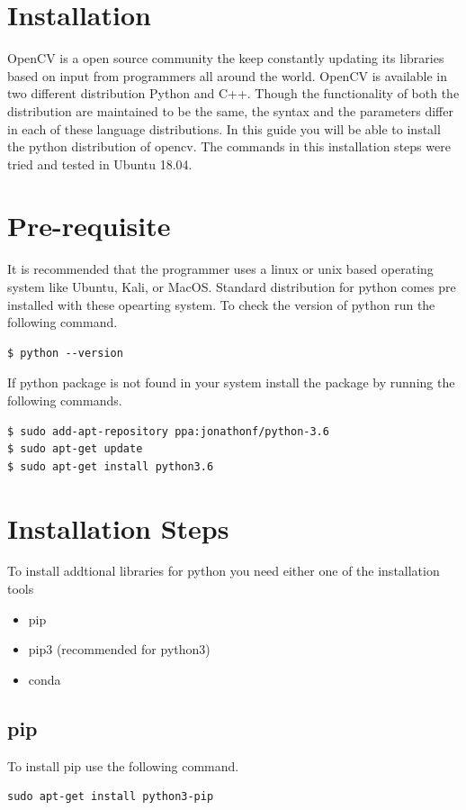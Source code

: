 \documentclass[11pt]{article}
\begin{document}
\section{Installation}
\label{sec-4}
OpenCV is a open source community the keep constantly updating its libraries  
based on input from programmers all around the world. OpenCV is available in two  
different distribution Python and C++. Though the functionality of both the distribution  
are maintained to be the same, the syntax and the parameters differ in each of these language  
distributions. In this guide you will be able to install the python distribution of opencv.  
The commands in this installation steps were tried and tested in Ubuntu 18.04.  

\section{Pre-requisite}
\label{sec-5}
It is recommended that the programmer uses a linux or unix based operating system like  
Ubuntu, Kali, or MacOS. Standard distribution for python comes pre installed with  
these opearting system. To check the version of python run the following command.  
\begin{verbatim}
$ python --version
\end{verbatim}
If python package is not found in your system install the package by running the  
following commands.  
\begin{verbatim}
$ sudo add-apt-repository ppa:jonathonf/python-3.6
$ sudo apt-get update
$ sudo apt-get install python3.6
\end{verbatim}
\section{Installation Steps}
\label{sec-6}
To install addtional libraries for python you need either one of the installation tools  
\begin{itemize}
\item pip
\item pip3 (recommended for python3)
\item conda
\end{itemize}
\subsection*{pip}
\label{sec-6-1}
To install pip use the following command.

\begin{verbatim}
sudo apt-get install python3-pip
\end{verbatim}
\end{document}
